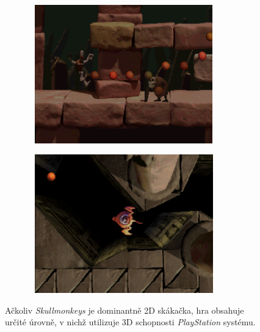 \begin{figure}[hbt]
    \begin{subfigure}{0.5\textwidth}
        \centering
        \includegraphics[width=0.9\textwidth, height=6cm]{obrazky-figures/skullmonkeys-showcase-1-1.png}
    \end{subfigure}
    \begin{subfigure}{0.5\textwidth}
        \centering
        \includegraphics[width=0.9\textwidth, height=6cm]{obrazky-figures/skullmonkeys-showcase-1-2.png}
    \end{subfigure}
    \caption[Test hry \textit{Skullmonkeys}]{Ačkoliv \textit{Skullmonkeys} je dominantně 2D skákačka, hra obsahuje určité úrovně, v nichž utilizuje 3D schopnosti \textit{PlayStation} systému.}
    \label{skullmonkeys-showcase-1}
\end{figure}

